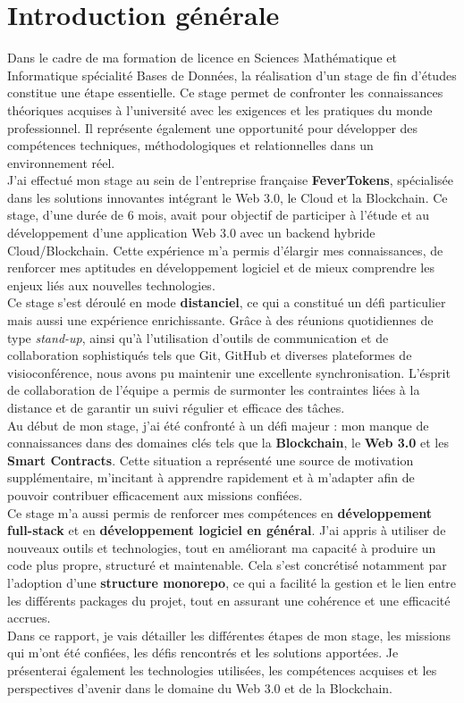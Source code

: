 \chapter*{Introduction générale}
Dans le cadre de ma formation de licence en Sciences Mathématique et Informatique spécialité Bases de Données, la réalisation d'un stage de fin d'études constitue une étape essentielle. Ce stage permet de confronter les connaissances théoriques acquises à l'université avec les exigences et les pratiques du monde professionnel. Il représente également une opportunité pour développer des compétences techniques, méthodologiques et relationnelles dans un environnement réel.\\[5mm]
J'ai effectué mon stage au sein de l'entreprise française \textbf{FeverTokens}, spécialisée dans les solutions innovantes intégrant le Web 3.0, le Cloud et la Blockchain. Ce stage, d'une durée de 6 mois, avait pour objectif de participer à l'étude et au développement d'une application Web 3.0 avec un backend hybride Cloud/Blockchain. Cette expérience m'a permis d'élargir mes connaissances, de renforcer mes aptitudes en développement logiciel et de mieux comprendre les enjeux liés aux nouvelles technologies.
\\[5mm]
Ce stage s'est déroulé en mode \textbf{distanciel}, ce qui a constitué un défi particulier mais aussi une expérience enrichissante. Grâce à des réunions quotidiennes de type \textit{stand-up}, ainsi qu'à l'utilisation d'outils de communication et de collaboration sophistiqués tels que Git, GitHub et diverses plateformes de visioconférence, nous avons pu maintenir une excellente synchronisation. L'\' esprit de collaboration de l'équipe a permis de surmonter les contraintes liées à la distance et de garantir un suivi régulier et efficace des tâches.
\\[5mm]
Au début de mon stage,  j'ai été confronté à un défi majeur : mon manque de connaissances dans des domaines clés tels que la \textbf{Blockchain}, le \textbf{Web 3.0} et les \textbf{Smart Contracts}. Cette situation a représenté une source de motivation supplémentaire, m'incitant à apprendre rapidement et à m'adapter afin de pouvoir contribuer efficacement aux missions confiées.\\[5mm]
Ce stage m'a aussi permis de renforcer mes compétences en \textbf{développement full-stack} et en \textbf{développement logiciel en général}. J'ai appris à utiliser de nouveaux outils et technologies, tout en améliorant ma capacité à produire un code plus propre, structuré et maintenable. Cela s'est concrétisé notamment par l'adoption d'une \textbf{structure monorepo}, ce qui a facilité la gestion et le lien entre les différents packages du projet, tout en assurant une cohérence et une efficacité accrues.\\[5mm]
Dans ce rapport, je vais détailler les différentes étapes de mon stage, les missions qui 
m'ont été confiées, les défis rencontrés et les solutions apportées. Je présenterai également les technologies utilisées, les compétences acquises et les perspectives d'avenir dans le domaine du Web 3.0 et de la Blockchain.\\[5mm]